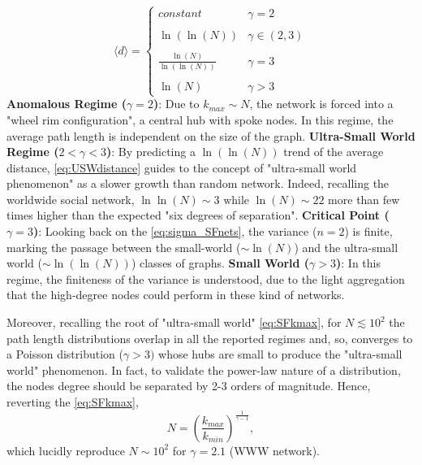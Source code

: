 \documentclass[a4paper,10pt,twoside]{book} %
\theoremstyle{definition}
\begin{document}
\begin{equation}
	\langle d \rangle = 
	\begin{cases}
		constant & \gamma = 2 \\ \\
		\ln(\ln(N)) & \gamma \in (2,3) \\ \\
		\frac{\ln(N)}{\ln(\ln(N))} & \gamma = 3 \\ \\
		\ln(N) & \gamma > 3
	\end{cases}
	\label{eq:USWdistance}
\end{equation}
\newline
\textbf{Anomalous Regime ($\gamma = 2$)}: Due to $k_{max} \sim N$, the network is forced into a "wheel rim configuration", a central hub with spoke nodes. In this regime, the average path length is independent on the size of the graph.
\newline
\textbf{Ultra-Small World Regime ($2 < \gamma < 3$)}: By predicting a $\ln(\ln(N))$ trend of the average distance, \autoref{eq:USWdistance} guides to the concept of "ultra-small world phenomenon" as a slower growth than random network. Indeed, recalling the worldwide social network, \(\ln\ln(N) \sim 3 \text{ while } \ln(N) \sim 22\) more than few times higher than the expected "six degrees of separation".
\newline
\textbf{Critical Point ($\gamma = 3$)}: Looking back on the \autoref{eq:sigma_SFnets}, the variance ($n=2$) is finite, marking the passage between the small-world ($\sim \ln(N)$) and the ultra-small world ($\sim \ln(\ln(N))$) classes of graphs.
\newline
\textbf{Small World ($\gamma > 3$)}:
In this regime, the finiteness of the variance is understood, due to the light aggregation that the high-degree nodes could perform in these kind of networks.

Moreover, recalling the root of "ultra-small world" \autoref{eq:SFkmax}, for $N \lesssim 10^2$ the path length distributions overlap in all the reported regimes and, so, converges to a Poisson distribution ($\gamma > 3)$ whose hubs are small to produce the "ultra-small world" phenomenon. In fact, to validate the power-law nature of a distribution, the nodes degree should be separated by 2-3 orders of magnitude. Hence, reverting the \autoref{eq:SFkmax},
\[N = \left(\frac{k_{max}}{k_{min}} \right)^\frac{1}{\gamma -1},\]
which lucidly reproduce $N \sim 10^2$ for $\gamma = 2.1$ (WWW network).
\end{document}
